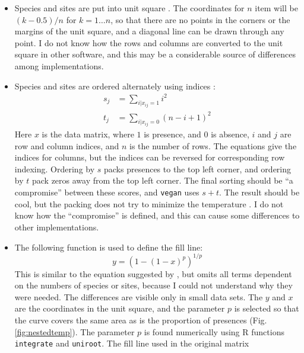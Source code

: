 \documentclass[a4paper,10pt]{amsart}
\begin{document}
\begin{itemize}
\item Species and sites are put into unit square \citep{RodGir06}. The
  coordinates for $n$ item will be $(k-0.5)/n$ for $k=1 \ldots n$, so
  that there are no points in the corners or the margins of the unit
  square, and a diagonal line can be drawn through any point. I do not
  know how the rows and columns are converted to the unit square in
  other software, and this may be a considerable source of differences
  among implementations.
  \item Species and sites are ordered alternately using indices
    \citep{RodGir06}:
    \begin{equation}
    \begin{split}
      s_j &= \sum_{i|x_{ij} = 1} i^2 \\
      t_j &= \sum_{i|x_{ij} = 0} (n-i+1)^2 
    \end{split}
    \end{equation}
    Here $x$ is the data matrix, where $1$ is presence, and $0$ is
    absence, $i$ and $j$ are row and column indices, and $n$ is the
    number of rows. The equations give the indices for columns, but
    the indices can be reversed for corresponding row indexing.
    Ordering by $s$ packs presences to the top left corner, and
    ordering by $t$ pack zeros away from the top left corner. The final
    sorting should be ``a compromise'' \cite{RodGir06} between these
    scores, and \texttt{vegan} uses $s+t$.  The result should be cool,
    but the packing does not try to minimize the temperature
    \citep{RodGir06}.  I do not know how the ``compromise'' is
    defined, and this can cause some differences to other
    implementations.
  \item The following function is used to define the fill line:
    \begin{equation}
      y = (1-(1-x)^p)^{1/p}
    \end{equation}
    This is similar to the equation suggested by
    \citet[eq. 4]{RodGir06}, but omits all terms dependent on the
    numbers of species or sites, because I could not understand why
    they were needed. The differences are visible only in small data
    sets. The $y$ and $x$ are the coordinates in the unit square, and
    the parameter $p$ is selected so that the curve covers the same
    area as is the proportion of presences
    (Fig. \ref{fig:nestedtemp}). The parameter $p$ is found
    numerically using \textsf{R} functions \texttt{integrate} and
    \texttt{uniroot}.  The fill line used in the original matrix

\end{itemize}
\end{document}
